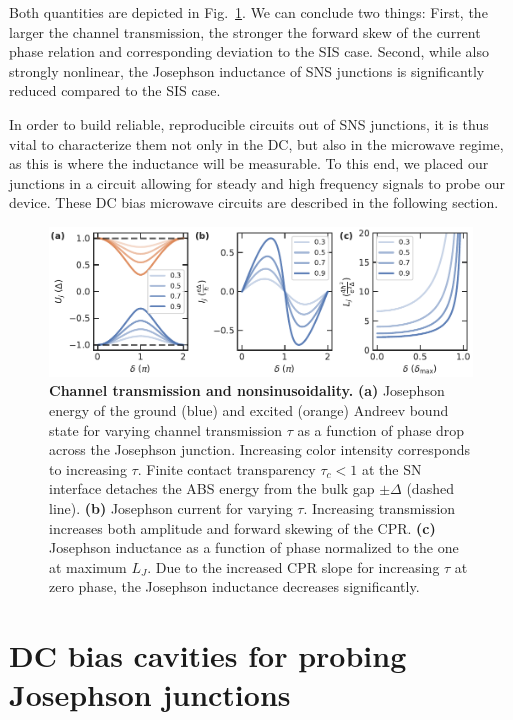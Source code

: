 Both quantities are depicted in Fig.~\ref{fig:modelsnsejic}.
%
We can conclude two things:
%
First, the larger the channel transmission, the stronger the forward skew of the current phase relation and corresponding deviation to the SIS case.
%
Second, while also strongly nonlinear, the Josephson inductance of SNS junctions is significantly reduced compared to the SIS case.

In order to build reliable, reproducible circuits out of SNS junctions, it is thus vital to characterize them not only in the DC, but also in the microwave regime, as this is where the inductance will be measurable.
%
To this end, we placed our junctions in a circuit allowing for steady and high frequency signals to probe our device.
%
These DC bias microwave circuits are described in the following section.

\begin{figure}[t]
	\centering
	\includegraphics[width=\linewidth]{chapter-introduction/figs/model_SNS_EjIc}
	\caption{
		\textbf{Channel transmission and nonsinusoidality.}
		\textbf{(a)} Josephson energy of the ground (blue) and excited (orange) Andreev bound state for varying channel transmission $\tau$ as a function of phase drop across the Josephson junction.
		Increasing color intensity corresponds to increasing $\tau$.
		Finite contact transparency $\tau_c<1$ at the SN interface detaches the ABS energy from the bulk gap $\pm\Delta$ (dashed line).
		\textbf{(b)} Josephson current for varying $\tau$.
		Increasing transmission increases both amplitude and forward skewing of the CPR.
		\textbf{(c)} Josephson inductance as a function of phase normalized to the one at maximum $L_J$.
		Due to the increased CPR slope for increasing $\tau$ at zero phase, the Josephson inductance decreases significantly.
	}
	\label{fig:modelsnsejic}
\end{figure}


\section{DC bias cavities for probing Josephson junctions}

